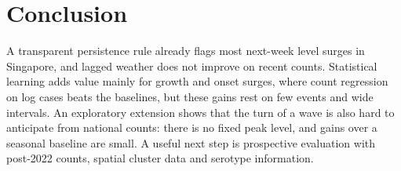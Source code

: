\section{Conclusion}
\label{sec:conclusion}
A transparent persistence rule already flags most next-week level surges in Singapore, and
lagged weather does not improve on recent counts. Statistical learning adds value mainly for
growth and onset surges, where count regression on log cases beats the baselines, but these
gains rest on few events and wide intervals. An exploratory extension shows that the turn of a wave is also hard to anticipate from national
counts: there is no fixed peak level, and gains over a seasonal baseline are small.
A useful next step is prospective evaluation with
post-2022 counts, spatial cluster data and serotype information.
